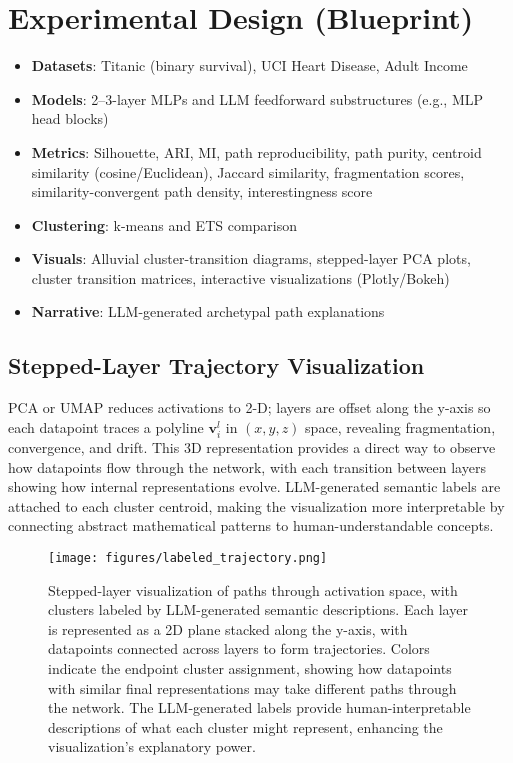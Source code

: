 \section{Experimental Design (Blueprint)}

\begin{itemize}
    \item \textbf{Datasets}: Titanic (binary survival), UCI Heart Disease, Adult Income
    \item \textbf{Models}: 2--3-layer MLPs and LLM feedforward substructures (e.g., MLP head blocks)
    \item \textbf{Metrics}: Silhouette, ARI, MI, path reproducibility, path purity, centroid similarity (cosine/Euclidean), Jaccard similarity, fragmentation scores, similarity-convergent path density, interestingness score
    \item \textbf{Clustering}: k-means and ETS comparison
    \item \textbf{Visuals}: Alluvial cluster-transition diagrams, stepped-layer PCA plots, cluster transition matrices, interactive visualizations (Plotly/Bokeh)
    \item \textbf{Narrative}: LLM-generated archetypal path explanations
\end{itemize}

\subsection{Stepped-Layer Trajectory Visualization}

PCA or UMAP reduces activations to 2-D; layers are offset along the y-axis so each datapoint traces a polyline $\mathbf{v}_i^l$ in $(x,y,z)$ space, revealing fragmentation, convergence, and drift. This 3D representation provides a direct way to observe how datapoints flow through the network, with each transition between layers showing how internal representations evolve. LLM-generated semantic labels are attached to each cluster centroid, making the visualization more interpretable by connecting abstract mathematical patterns to human-understandable concepts.

\begin{figure}[ht]
    \centering
    \texttt{[image: figures/labeled\_trajectory.png]}
    \caption{Stepped-layer visualization of paths through activation space, with clusters labeled by LLM-generated semantic descriptions. Each layer is represented as a 2D plane stacked along the y-axis, with datapoints connected across layers to form trajectories. Colors indicate the endpoint cluster assignment, showing how datapoints with similar final representations may take different paths through the network. The LLM-generated labels provide human-interpretable descriptions of what each cluster might represent, enhancing the visualization's explanatory power.}
    \label{fig:labeled_trajectory}
\end{figure}

